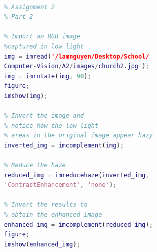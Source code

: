\documentclass[conference]{IEEEtran}
\begin{document}
\begin{lstlisting}[language=Matlab]

% Assignment 2
% Part 2

% Import an RGB image 
%captured in low light
img = imread('/lamnguyen/Desktop/School/
Computer-Vision/A2/images/church2.jpg');
img = imrotate(img, 90);
figure; 
imshow(img);

% Invert the image and 
% notice how the low-light
% areas in the original image appear hazy
inverted_img = imcomplement(img);

% Reduce the haze 
reduced_img = imreducehaze(inverted_img, 
'ContrastEnhancement', 'none');

% Invert the results to 
% obtain the enhanced image
enhanced_img = imcomplement(reduced_img);
figure;
imshow(enhanced_img);

\end{lstlisting}
\end{document}
